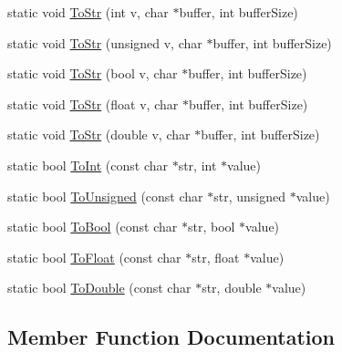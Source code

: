 \begin{DoxyCompactItemize}
\item 
static void \hyperlink{classtinyxml2_1_1_x_m_l_util_a3cd6c703d49b9d51bdf0f4ff6aa021c7}{To\+Str} (int v, char $\ast$buffer, int buffer\+Size)
\item 
static void \hyperlink{classtinyxml2_1_1_x_m_l_util_ac00c2e52c1c36dab3ff41d86a9bf60f9}{To\+Str} (unsigned v, char $\ast$buffer, int buffer\+Size)
\item 
static void \hyperlink{classtinyxml2_1_1_x_m_l_util_adba0718527ae9e80f663a71ea325cb11}{To\+Str} (bool v, char $\ast$buffer, int buffer\+Size)
\item 
static void \hyperlink{classtinyxml2_1_1_x_m_l_util_a8957ad44fee5fa02ba52d73aad4d0a31}{To\+Str} (float v, char $\ast$buffer, int buffer\+Size)
\item 
static void \hyperlink{classtinyxml2_1_1_x_m_l_util_a1cd141e50980fcddd6bf9af5de4b1db7}{To\+Str} (double v, char $\ast$buffer, int buffer\+Size)
\item 
static bool \hyperlink{classtinyxml2_1_1_x_m_l_util_ad4df4023d11ee3fca9689c49b9707323}{To\+Int} (const char $\ast$str, int $\ast$value)
\item 
static bool \hyperlink{classtinyxml2_1_1_x_m_l_util_a210c8637d5eb4ce3d4625294af0efc2f}{To\+Unsigned} (const char $\ast$str, unsigned $\ast$value)
\item 
static bool \hyperlink{classtinyxml2_1_1_x_m_l_util_ae5b03e0a1ca5d42052a7ac540f7aa12a}{To\+Bool} (const char $\ast$str, bool $\ast$value)
\item 
static bool \hyperlink{classtinyxml2_1_1_x_m_l_util_a399e71edb5f29d61ea81d91ee0332bb9}{To\+Float} (const char $\ast$str, float $\ast$value)
\item 
static bool \hyperlink{classtinyxml2_1_1_x_m_l_util_ad8f75ac140fb19c1c6e164a957c4cd53}{To\+Double} (const char $\ast$str, double $\ast$value)
\end{DoxyCompactItemize}


\subsection{Member Function Documentation}
\hypertarget{classtinyxml2_1_1_x_m_l_util_a31c00d5c5dfb38382de1dfcaf4be3595}{}
